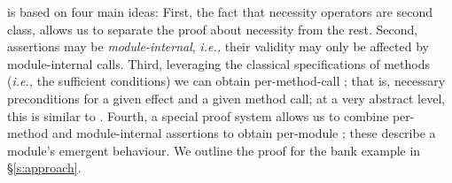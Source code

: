 \Chainlogic is based on four main ideas: 
First,  the fact that necessity operators are second class, allows us to 
 separate the proof about necessity from the rest.
 Second, assertions may be \emph{module-internal}, \textit{i.e.,}
their validity may only be affected by module-internal calls. 
Third, leveraging the classical  specifications of methods 
(\textit{i.e.,} the sufficient conditions) we can obtain per-method-call
 \NecessitySpecifications; that is, necessary preconditions
  for a given effect and a given method call;  at a very abstract level, this is
similar to  \cite{threoremsFreeSep}.
Fourth,  a special proof system allows us to combine 
per-method
 \NecessitySpecifications and module-internal assertions 
 to obtain per-module   \NecessitySpecifications; these describe a module's
 emergent behaviour.
We outline the proof for the bank example in  \S\ref{s:approach}.
 
% 
% 
%
% 
% 



